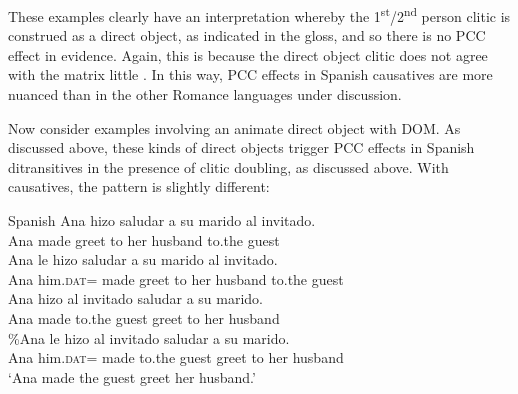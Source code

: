 \documentclass[output=paper,colorlinks,citecolor=brown,nonflat]{./langscibook}
\begin{document}
These examples clearly have an interpretation whereby the 1\textsuperscript{st}/2\textsuperscript{nd} person clitic is construed as a direct object, as indicated in the gloss, and so there is no PCC effect in evidence. Again, this is because the direct object clitic does not agree with the matrix little \liv . In this way, PCC effects in Spanish causatives are more nuanced than in the other Romance languages under discussion. 

Now consider examples involving an animate direct object with DOM. As discussed above, these kinds of direct objects trigger PCC effects in Spanish ditransitives in the presence of clitic doubling, as discussed above. With causatives, the pattern is slightly different:

\ea%
    \label{ex:sheehan:35}
    Spanish
    \ea\label{ex:sheehan:35a}
    \gll    *Ana   hizo   saludar   a   su   marido   al    invitado.\\
            Ana   made   greet   to   her   husband  to.the   guest\\
    \ex\label{ex:sheehan:35b}
    \gll    *Ana   le   hizo   saludar   a   su   marido   al   invitado.\\
            Ana   him.\textsc{dat}=   made   greet   to   her husband to.the   guest\\
    \ex\label{ex:sheehan:35c}
    \gll    Ana   hizo     al     invitado   saludar   a   su   marido.\\
            Ana   made   to.the   guest   greet   to   her   husband\\
    \ex\label{ex:sheehan:35d}
    \gll    \%Ana le   hizo   al   invitado saludar   a     su   marido.\\
            Ana   him.\textsc{dat}=   made   to.the   guest   greet   to   her   husband\\
    \glt    ‘Ana made the guest greet her husband.’
    \z
\z
\end{document}
